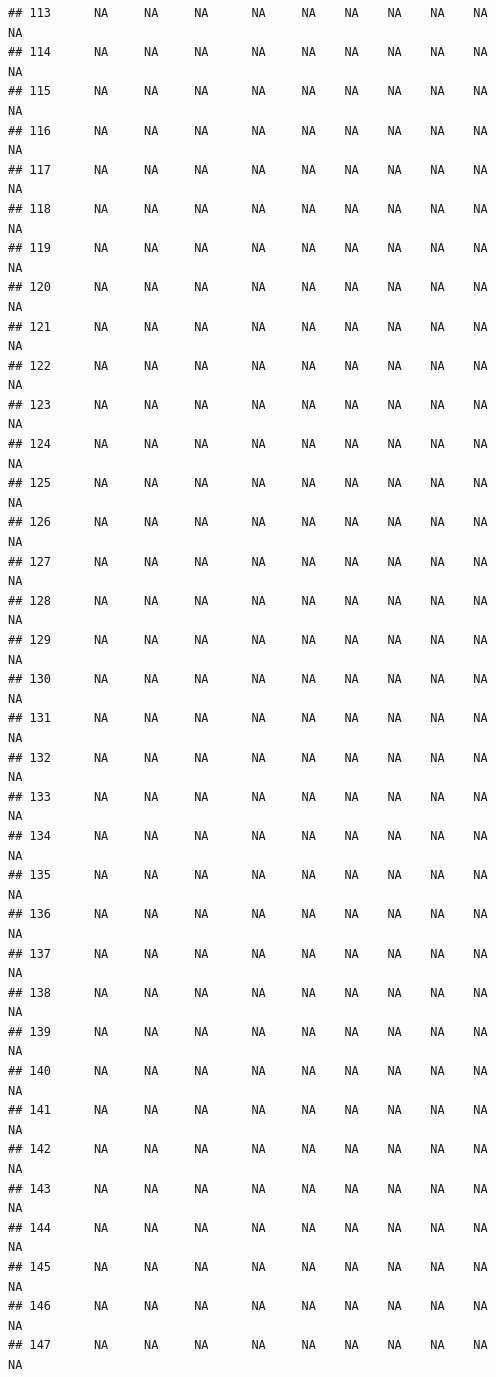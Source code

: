 \documentclass{article}\usepackage{graphicx, color}
\makeatletter
\newenvironment{kframe}{%
 \def\at@end@of@kframe{}%
 \ifinner\ifhmode%
  \def\at@end@of@kframe{\end{minipage}}%
  \begin{minipage}{\columnwidth}%
 \fi\fi%
 \def\FrameCommand##1{\hskip\@totalleftmargin \hskip-\fboxsep
 \colorbox{shadecolor}{##1}\hskip-\fboxsep
     \hskip-\linewidth \hskip-\@totalleftmargin \hskip\columnwidth}%
 \MakeFramed {\advance\hsize-\width
   \@totalleftmargin\z@ \linewidth\hsize
   \@setminipage}}%
 {\par\unskip\endMakeFramed%
 \at@end@of@kframe}
\newenvironment{knitrout}{}{} %
\makeatother
\begin{document}
\begin{knitrout}
\begin{kframe}
\begin{verbatim}
## 113      NA     NA     NA      NA     NA    NA    NA    NA    NA     NA
## 114      NA     NA     NA      NA     NA    NA    NA    NA    NA     NA
## 115      NA     NA     NA      NA     NA    NA    NA    NA    NA     NA
## 116      NA     NA     NA      NA     NA    NA    NA    NA    NA     NA
## 117      NA     NA     NA      NA     NA    NA    NA    NA    NA     NA
## 118      NA     NA     NA      NA     NA    NA    NA    NA    NA     NA
## 119      NA     NA     NA      NA     NA    NA    NA    NA    NA     NA
## 120      NA     NA     NA      NA     NA    NA    NA    NA    NA     NA
## 121      NA     NA     NA      NA     NA    NA    NA    NA    NA     NA
## 122      NA     NA     NA      NA     NA    NA    NA    NA    NA     NA
## 123      NA     NA     NA      NA     NA    NA    NA    NA    NA     NA
## 124      NA     NA     NA      NA     NA    NA    NA    NA    NA     NA
## 125      NA     NA     NA      NA     NA    NA    NA    NA    NA     NA
## 126      NA     NA     NA      NA     NA    NA    NA    NA    NA     NA
## 127      NA     NA     NA      NA     NA    NA    NA    NA    NA     NA
## 128      NA     NA     NA      NA     NA    NA    NA    NA    NA     NA
## 129      NA     NA     NA      NA     NA    NA    NA    NA    NA     NA
## 130      NA     NA     NA      NA     NA    NA    NA    NA    NA     NA
## 131      NA     NA     NA      NA     NA    NA    NA    NA    NA     NA
## 132      NA     NA     NA      NA     NA    NA    NA    NA    NA     NA
## 133      NA     NA     NA      NA     NA    NA    NA    NA    NA     NA
## 134      NA     NA     NA      NA     NA    NA    NA    NA    NA     NA
## 135      NA     NA     NA      NA     NA    NA    NA    NA    NA     NA
## 136      NA     NA     NA      NA     NA    NA    NA    NA    NA     NA
## 137      NA     NA     NA      NA     NA    NA    NA    NA    NA     NA
## 138      NA     NA     NA      NA     NA    NA    NA    NA    NA     NA
## 139      NA     NA     NA      NA     NA    NA    NA    NA    NA     NA
## 140      NA     NA     NA      NA     NA    NA    NA    NA    NA     NA
## 141      NA     NA     NA      NA     NA    NA    NA    NA    NA     NA
## 142      NA     NA     NA      NA     NA    NA    NA    NA    NA     NA
## 143      NA     NA     NA      NA     NA    NA    NA    NA    NA     NA
## 144      NA     NA     NA      NA     NA    NA    NA    NA    NA     NA
## 145      NA     NA     NA      NA     NA    NA    NA    NA    NA     NA
## 146      NA     NA     NA      NA     NA    NA    NA    NA    NA     NA
## 147      NA     NA     NA      NA     NA    NA    NA    NA    NA     NA

\end{verbatim}
\end{kframe}
\end{knitrout}
\end{document}
